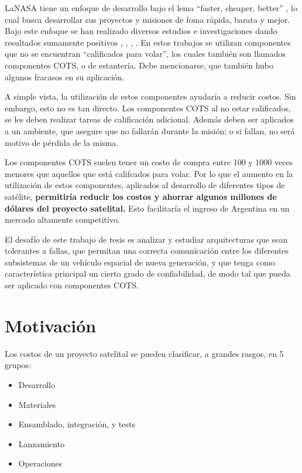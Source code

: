 La\ac{NASA} tiene un enfoque de desarrollo bajo el lema 
``faster, cheaper, better'' \cite{Forsberg99}, lo cual busca desarrollar sus proyectos y misiones 
de foma rápida, barata y mejor. Bajo este enfoque se han realizado diversos estudios e 
investigaciones dando resultados sumamente positivos \cite{Tai99}, \cite{Chau99}, 
\cite{Schneidewind98}, \cite{Forsberg99}. En estos trabajos se utilizan componentes que no se 
encuentran ``calificados para volar'',  los cuales también son llamados componentes \ac{COTS}, o de estantería. Debe mencionarse, que también hubo algunos 
fracasos en su aplicación. 

A simple vista, la utilización de estos componentes ayudaría a reducir costos. Sin embargo, esto 
no es tan directo. Los componentes \ac{COTS} al no estar calificados, se les deben realizar tareas 
de calificación adicional. Además deben ser aplicados a un ambiente, que asegure 
que no fallarán durante la misión; o si fallan, no será motivo de pérdida de la misma. 

Los componentes \ac{COTS} suelen tener un costo de compra entre 100 y 1000 veces menores que aquellos 
que está califcados para volar. Por lo que el aumento en la utilización de estos componentes, 
aplicados al desarrollo de diferentes tipos de satélite, \textbf{permitiría reducir los costos y 
ahorrar algunos millones de dólares del proyecto satelital.} Esto facilitaría el ingreso de 
Argentina en un mercado altamente competitivo.

El desafío de este trabajo de tesis es analizar y estudiar arquitecturas que sean tolerantes a 
fallas, que permitan una correcta comunicación entre los diferentes subsistemas de un vehículo 
espacial de nueva generación, y que tenga como característica principal un cierto grado de confiabilidad, de modo tal que pueda ser aplicado con componentes \ac{COTS}.

\section{Motivación}\label{chap:motivacion}
Los costos de un proyecto satelital se pueden clasificar, a grandes rasgos, en 5 grupos:
\begin{itemize}
 \item Desarrollo
 \item Materiales
 \item Ensamblado, integración, y tests
 \item Lanzamiento
 \item Operaciones
\end{itemize}

